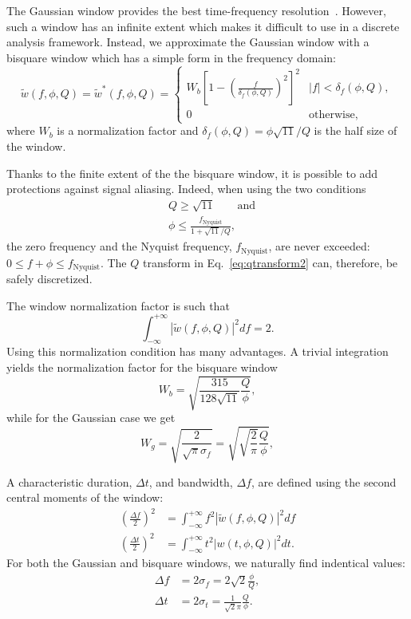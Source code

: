 \documentclass[aps]{revtex4-1}
\begin{document}
The Gaussian window provides the best time-frequency resolution~\cite{Gabor:1946}. However, such a window has an infinite extent which makes it difficult to use in a discrete analysis framework. Instead, we approximate the Gaussian window with a bisquare window which has a simple form in the frequency domain:
\begin{equation}
  \tilde{w}(f,\phi,Q) = \tilde{w}^*(f,\phi,Q) =
  \begin{cases}
    W_b\left[1 - \left(\frac{f}{\delta_f(\phi,Q)}\right)^2 \right]^2 & |f| < \delta_f(\phi,Q), \\
    0 & \textrm{otherwise},
  \end{cases}
  \label{eq:bisquare}
\end{equation}
where $W_b$ is a normalization factor and $\delta_f(\phi,Q)=\phi\sqrt{11}/Q$ is the half size of the window.

Thanks to the finite extent of the the bisquare window, it is possible to add protections against signal aliasing. Indeed, when using the two conditions
\begin{align}
  &Q\ge\sqrt{11} \qquad \text{and}\label{eq:antialias1} \\
  &\phi \le \frac{f_{\text{Nyquist}}}{1+\sqrt{11}/Q}, \label{eq:antialias2}
\end{align}
the zero frequency and the Nyquist frequency, $f_{\text{Nyquist}}$, are never exceeded: $0 \le f + \phi \le f_{\text{Nyquist}}$. The $Q$ transform in Eq.~\ref{eq:qtransform2} can, therefore, be safely discretized.

The window normalization factor is such that
\begin{equation}
  \int_{-\infty}^{+\infty}{|\tilde{w}(f,\phi,Q)|^2df} = 2.
  \label{eq:winnorm}
\end{equation}
Using this normalization condition has many advantages. A trivial integration yields the normalization factor for the bisquare window
\begin{equation}
  W_b = \sqrt{\frac{315}{128\sqrt{11}} \frac{Q}{\phi}},
  \label{eq:Wb}
\end{equation}
while for the Gaussian case we get
\begin{equation}
  W_g = \sqrt{\frac{2}{\sqrt{\pi}\sigma_f}} = \sqrt{\sqrt{\frac{2}{\pi}} \frac{Q}{\phi}},
  \label{eq:Wg}
\end{equation}

A characteristic duration, $\Delta t$, and bandwidth, $\Delta f$, are defined using the second central moments of the window:
\begin{align}
  \left(\frac{\Delta f}{2}\right)^2 &= \int_{-\infty}^{+\infty}{f^2|\tilde{w}(f,\phi,Q)|^2 df}\\
  \left(\frac{\Delta t}{2}\right)^2 &= \int_{-\infty}^{+\infty}{t^2|w(t,\phi,Q)|^2 dt}.
\end{align}
For both the Gaussian and bisquare windows, we naturally find indentical values:
\begin{align}
  \Delta f &=  2\sigma_f = 2\sqrt{2}\frac{\phi}{Q},  \label{eq:sigf} \\ 
  \Delta t &=  2\sigma_t = \frac{1}{\sqrt{2}\pi}\frac{Q}{\phi}. \label{eq:sigt}
\end{align}
\end{document}

